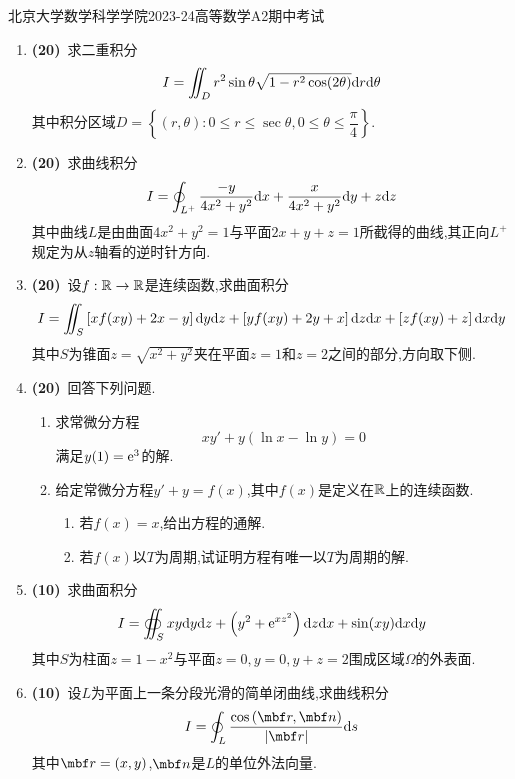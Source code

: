\documentclass{ctexart}
\begin{document}
\pagestyle{empty}
\begin{center}\Large
    北京大学数学科学学院2023-24高等数学A2期中考试
\end{center}
\begin{enumerate}[leftmargin=*,label=\textbf{\arabic*.}]
    \item \textbf{(20)}\ 求二重积分
    \[I=\iint_{D}r^2\sin\theta\sqrt{1-r^2\cos(2\theta)}\mathrm{d} r\mathrm{d}\theta\]
    其中积分区域$D=\left\{(r,\theta):0\leqslant r\leqslant\sec\theta,0\leqslant\theta\leqslant\dfrac\pi4\right\}$.

    \item \textbf{(20)}\ 求曲线积分
    \[I=\oint_{L^+}\dfrac{-y}{4x^2+y^2}\mathrm{d} x+\dfrac{x}{4x^2+y^2}\mathrm{d} y+z\mathrm{d} z\]
    其中曲线$L$是由曲面$4x^2+y^2=1$与平面$2x+y+z=1$所截得的曲线,其正向$L^+$规定为从$z$轴看的逆时针方向.

    \item \textbf{(20)}\ 设$f:\mathbb{R}\to\mathbb{R}$是连续函数,求曲面积分
    \[I=\iint_S\left[xf(xy)+2x-y\right]\mathrm{d} y\mathrm{d} z+\left[yf(xy)+2y+x\right]\mathrm{d} z\mathrm{d} x+\left[zf(xy)+z\right]\mathrm{d} x\mathrm{d} y\]
    其中$S$为锥面$z=\sqrt{x^2+y^2}$夹在平面$z=1$和$z=2$之间的部分,方向取下侧.

    \item \textbf{(20)}\ 回答下列问题.
    \begin{enumerate}[label=\tbf{(\arabic*)}]
        \item 求常微分方程
            \[xy'+y\left(\ln x-\ln y\right)=0\]
            满足$y(1)=\mathrm{e}^3$的解.
        \item 给定常微分方程$y'+y=f(x)$,其中$f(x)$是定义在$\mathbb{R}$上的连续函数.
            \begin{enumerate}[label=\tbf{(\alph*)}]
                \item 若$f(x)=x$,给出方程的通解.
                \item 若$f(x)$以$T$为周期,试证明方程有唯一以$T$为周期的解.
            \end{enumerate}
    \end{enumerate}

    \item \textbf{(10)}\ 求曲面积分
    \[I=\oiint_{S}xy\mathrm{d} y\mathrm{d} z+\left(y^2+\mathrm{e}^{xz^2}\right)\mathrm{d} z\mathrm{d} x+\sin(xy)\mathrm{d} x\mathrm{d} y\]
    其中$S$为柱面$z=1-x^2$与平面$z=0,y=0,y+z=2$围成区域$\Omega$的外表面.

    \item \textbf{(10)}\ 设$L$为平面上一条分段光滑的简单闭曲线,求曲线积分
    \[I=\oint_{L}\dfrac{\cos\left(\mbf r,\mbf n\right)}{\left|\mbf r\right|}\di s\]
    其中$\mbf r=(x,y)$,$\mbf n$是$L$的单位外法向量.

\end{enumerate}
\end{document}
